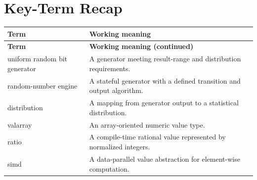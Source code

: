 \documentclass[11pt,letterpaper]{article}
\begin{document}
\section{Key-Term Recap}
\begin{longtable}{@{}>{\RaggedRight\arraybackslash}p{}>{\RaggedRight\arraybackslash}p{}@{}}\toprule\textbf{Term} & \textbf{Working meaning}\\\midrule\endfirsthead\toprule\textbf{Term} & \textbf{Working meaning (continued)}\\\midrule\endhead\bottomrule\endfoot
uniform random bit generator & A generator meeting result-range and distribution requirements.\\
random-number engine & A stateful generator with a defined transition and output algorithm.\\
distribution & A mapping from generator output to a statistical distribution.\\
valarray & An array-oriented numeric value type.\\
ratio & A compile-time rational value represented by normalized integers.\\
simd & A data-parallel value abstraction for element-wise computation.\\
\end{longtable}
\end{document}
